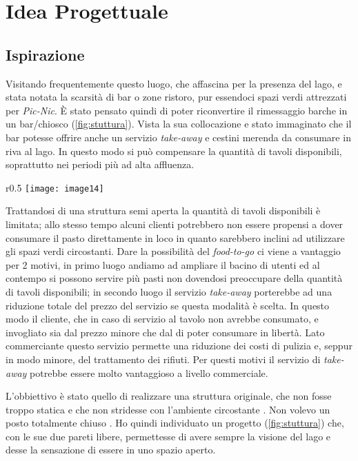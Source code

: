 \section{Idea Progettuale}

\subsection{Ispirazione}

Visitando frequentemente questo luogo, che affascina per la presenza del lago, e stata notata la scarsità di bar o zone ristoro, pur essendoci spazi verdi attrezzati per \textit{Pic-Nic}. È stato pensato quindi di poter riconvertire il rimessaggio barche in un bar/chiosco (\cref{fig:stuttura}). Vista la sua collocazione e stato immaginato che il bar potesse offrire anche un servizio \textit{take-away} e cestini merenda da consumare in riva al lago. In questo modo si può compensare la quantità di tavoli disponibili, soprattutto nei periodi più ad alta affluenza. 

\begin{wrapfigure}[18]{r}{0.5\textwidth}
	\centering
	\texttt{[image: image14]}
	\caption{Struttura}
	\label{fig:stuttura}
\end{wrapfigure}

Trattandosi di una struttura semi aperta la quantità di tavoli disponibili è limitata; allo stesso tempo alcuni clienti potrebbero non essere propensi a dover consumare il pasto direttamente in loco in quanto sarebbero inclini ad utilizzare gli spazi verdi circostanti. Dare la possibilità del \textit{food-to-go} ci viene a vantaggio per 2 motivi, in primo luogo andiamo ad ampliare il bacino di utenti ed al contempo si possono servire più pasti non dovendosi preoccupare della quantità di tavoli disponibili; in secondo luogo il servizio \textit{take-away} porterebbe ad una riduzione totale del prezzo del servizio se questa modalità è scelta. In questo modo il cliente, che in caso di servizio al tavolo non avrebbe consumato, e invogliato sia dal prezzo minore che dal  di poter consumare in libertà. Lato commerciante questo servizio permette una riduzione dei costi di pulizia e, seppur in modo minore, del trattamento dei rifiuti.  Per questi motivi il servizio di \textit{take-away} potrebbe essere molto vantaggioso a livello commerciale.

L'obbiettivo è stato quello di realizzare una struttura  originale, che non fosse troppo statica e che non  stridesse con l’ambiente circostante . Non volevo un posto totalmente chiuso . Ho quindi individuato un progetto (\cref{fig:stuttura}) che,  con  le sue due  pareti libere,  permettesse di avere sempre la visione del lago e desse la sensazione di essere in uno spazio aperto. 

